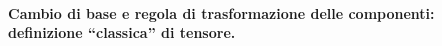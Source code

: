 

 \paragraph{Cambio di base e regola di trasformazione delle componenti: definizione ``classica'' di tensore.} 
 

